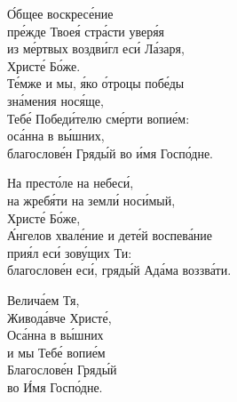 \documentclass{article}
\begin{document}
%
О́бщее воскресе́ние \\
пре́жде Твоея́ стра́сти уверя́я \\
из ме́ртвых воздви́гл еси́ Ла́заря, \\
            \cont Христе́ Бо́же. \\
Те́мже и мы, я́ко о́троцы побе́ды \\
            \cont зна́мения нося́ще, \\
Тебе́ Победи́телю сме́рти вопие́м: \\
оса́нна в вы́шних, \\
благослове́н Гряды́й во и́мя Госпо́дне.

На престо́ле на небеси́, \\
на жребя́ти на земли́ носи́мый, \\
        \cont Христе́ Бо́же,\\
А́нгелов хвале́ние и дете́й воспева́ние \\
прия́л еси́ зову́щих Ти:\\
благослове́н еси́, гряды́й Ада́ма воззва́ти.

Велича́ем Тя, \\
Живода́вче Христе́, \\
Оса́нна в вы́шних \\
и мы Тебе́ вопие́м \\
Благослове́н Гряды́й \\
во И́мя Госпо́дне.
\end{document}
